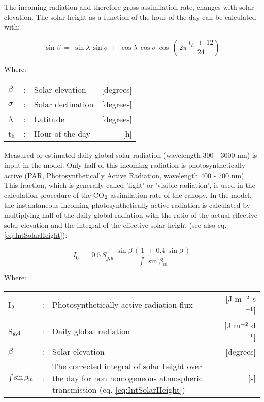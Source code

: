 The incoming radiation and therefore gross assimilation rate, changes with solar elevation. 
The solar height as a function of the hour of the day can be calculated with:

\begin{equation}
\label{eq:5.7}
\sin \beta ~=~ \sin \lambda \, \sin \sigma ~+~ \cos \lambda \, \cos \sigma \, \cos \, 
(\, 2 \pi \,{\frac{t _{h} ~+~ 12}{24}} )
\end{equation}


Where:\\[5pt]
\begin{tabularx}{\textwidth}{llXr}
	$\beta$ &:& Solar elevation   &    [degrees]\\
	$\sigma$ &:& Solar declination    &    [degrees]\\
	$\lambda$ &:& Latitude     &   [degrees]\\
	t$_{{\rm h}}$ &:& Hour of the day    &    [h]\\
\end{tabularx}

Measured or estimated daily global solar radiation  (wavelength 300 - 3000 nm) is input
in the model. Only half of this incoming radiation is photosynthetically active (PAR,
Photosynthetically Active Radiation, wavelength 400 - 700 nm). This fraction, which is
generally called 'light' or 'visible radiation', is used in the calculation procedure of the
CO$_{{\rm 2}}$ assimilation rate of the canopy. In the model, the instantaneous incoming 
photosynthetically active radiation is calculated by multiplying half of the daily global radiation
with the ratio of the actual effective solar elevation and the integral of the effective solar
height (see also eq. \ref{eq:IntSolarHeight}):

\begin{equation}
\label{eq:5.8}
I _{0} ~=~ 0.5\, S _{g,d} \,{\frac{\sin \beta \, (\, 1~+~0.4\, \sin \beta \, )}{\int \, \sin \beta _{m} }}
\end{equation}

Where:\\[5pt]
\begin{tabularx}{\textwidth}{llXr}
	I$_{{\rm 0}}$ &:& Photosynthetically active radiation flux    &    
	[J m$^{{\rm -2}}$ s$^{{\rm -1}}$]\\
	S$_{{\rm g,d}}$ &:& Daily global radiation   &     
	[J m$^{{\rm -2}}$ d$^{{\rm -1}}$] \\
	$\beta$ &:& Solar elevation    &    [degrees]\\
	$\int \sin \beta_{{\rm m}}$ &:& The corrected integral of solar height over the day 
	for non homogeneous atmospheric transmission (eq. \ref{eq:IntSolarHeight})   
	&     [s]\\
\end{tabularx}

